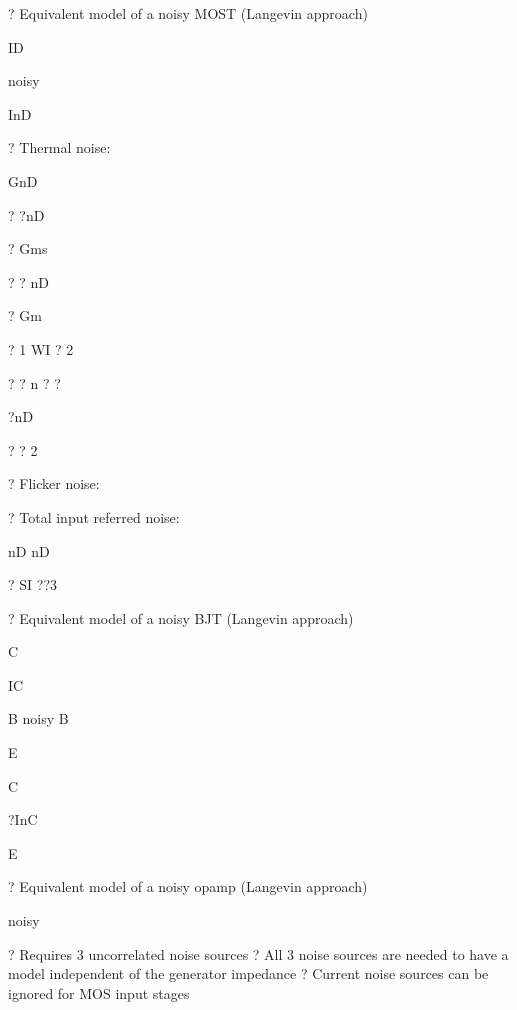 \documentclass[2pt,landscape]{article}
\begin{document}
\begin{multicols*}{5}
?	Equivalent model of a noisy MOST (Langevin approach)




ID

noisy



InD









?	Thermal noise:



GnD


? ?nD



? Gms


? ? nD



? Gm


? 1	WI
? 2


?	? n ? ?


?nD


? ? 2


?	Flicker noise:



?	Total input referred noise:


nD	nD


?	SI
??3



?	Equivalent model of a noisy BJT (Langevin approach)


C

IC

B	noisy	B



E


C



?InC



E







?	Equivalent model of a noisy opamp (Langevin approach)






noisy






?	Requires 3 uncorrelated noise sources
?	All 3 noise sources are needed to have a model independent of the 
generator impedance
?	Current noise sources can be ignored for MOS input stages







\end{multicols*}
\end{document}
